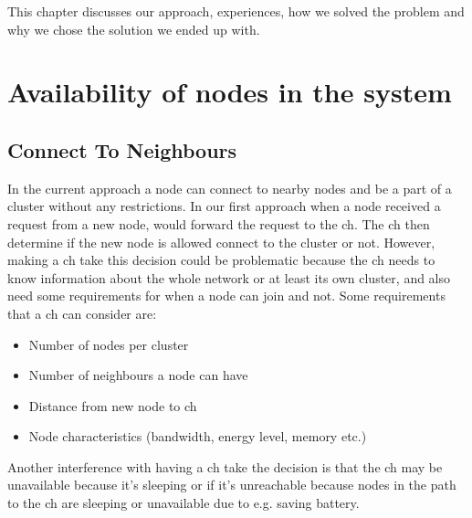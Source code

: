 \documentclass[USenglish]{uit-thesis}
\begin{document}
This chapter discusses our approach, experiences, how we solved the problem and why we chose the solution we ended up with.

\section{Availability of nodes in the system}

\subsection{Connect To Neighbours} \label{disc:conn_neighbours}


In the current approach a node can connect to nearby nodes and be a part of a cluster without any restrictions. In our first approach when a node received a request from a new node, would forward the request to the \gls{ch}. The \gls{ch} then determine if the new node is allowed connect to the cluster or not. However, making a \gls{ch} take this decision could be problematic because the \gls{ch} needs to know information about the whole network or at least its own cluster, and also need some requirements for when a node can join and not. Some requirements that a \gls{ch} can consider are:

\begin{itemize}
\item Number of nodes per cluster
\item Number of neighbours a node can have
\item Distance from new node to \gls{ch}
\item Node characteristics (bandwidth, energy level, memory etc.)
\end{itemize}

Another interference with having a \gls{ch} take the decision is that the \gls{ch} may be unavailable because it's sleeping or if it's unreachable because nodes in the path to the \gls{ch} are sleeping or unavailable due to e.g. saving battery. 

\end{document}
